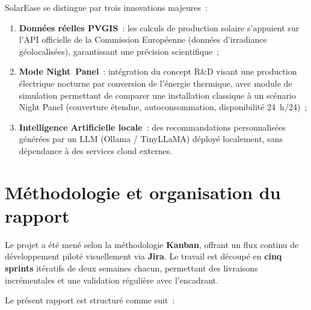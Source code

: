 SolarEase se distingue par trois innovations majeures~:
\begin{enumerate}
  \item \textbf{Données réelles PVGIS}~: les calculs de production solaire
    s'appuient sur l'API officielle de la Commission Européenne (données
    d'irradiance géolocalisées), garantissant une précision scientifique~;
  \item \textbf{Mode Night~Panel}~: intégration du concept R\&D \organisme{}
    visant une production électrique nocturne par conversion de l'énergie
    thermique, avec module de simulation permettant de comparer une installation
    classique à un scénario Night Panel (couverture étendue, autoconsommation,
    disponibilité 24~h/24)~;
  \item \textbf{Intelligence Artificielle locale}~: des recommandations
    personnalisées générées par un LLM (Ollama / TinyLLaMA) déployé
    localement, sans dépendance à des services cloud externes.
\end{enumerate}

\section*{Méthodologie et organisation du rapport}

Le projet a été mené selon la méthodologie \textbf{Kanban}, offrant un flux
continu de développement piloté visuellement via \textbf{Jira}. Le travail
est découpé en \textbf{cinq sprints} itératifs de deux semaines chacun,
permettant des livraisons incrémentales et une validation régulière avec
l'encadrant.

Le présent rapport est structuré comme suit~:

